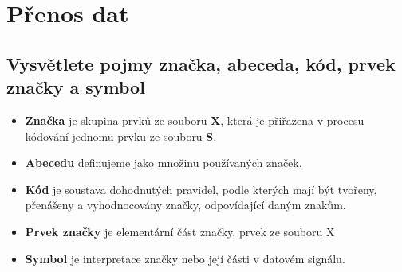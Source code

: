 \clearpage
\section{Přenos dat}
\subsection{Vysvětlete pojmy značka, abeceda, kód, prvek značky a symbol}
\begin{itemize}
    \item \textbf{Značka} je skupina prvků ze souboru \textbf{X}, která je přiřazena v procesu kódování jednomu prvku ze souboru \textbf{S}.
    \item \textbf{Abecedu} definujeme jako množinu používaných značek.
    \item \textbf{Kód} je soustava dohodnutých pravidel, podle kterých mají být tvořeny, přenášeny a vyhodnocovány značky, odpovídající daným znakům.
    \item \textbf{Prvek značky} je elementární část značky, prvek ze souboru X
    \item \textbf{Symbol} je interpretace značky nebo její části v datovém signálu.
\end{itemize}

